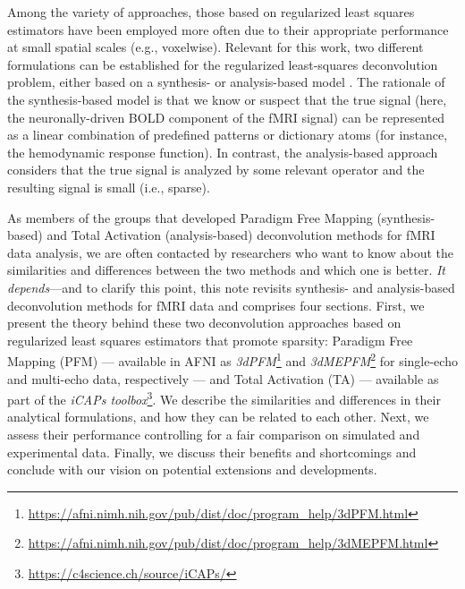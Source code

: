 Among the variety of approaches, those based on regularized least squares
estimators have been employed more often due to their appropriate performance at
small spatial scales (e.g., voxelwise). Relevant for this work, two different
formulations can be established for the regularized least-squares deconvolution
problem, either based on a synthesis- or analysis-based model
\citep{Elad2007Analysisversussynthesis,ortelli2019synthesis}. The rationale
of the synthesis-based model is that we know or suspect that the true signal
(here, the neuronally-driven BOLD component of the fMRI signal) can be
represented as a linear combination of predefined patterns or dictionary atoms
(for instance, the hemodynamic response function). In contrast, the
analysis-based approach considers that the true signal is analyzed by some
relevant operator and the resulting signal is small (i.e., sparse).

As members of the groups that developed Paradigm Free Mapping (synthesis-based)
and Total Activation (analysis-based) deconvolution methods for fMRI data
analysis, we are often contacted by researchers who want to know about the
similarities and differences between the two methods and which one is better.
\emph{It depends}---and to clarify this point, this note revisits synthesis- and
analysis-based deconvolution methods for fMRI data and comprises four sections.
First, we present the theory behind these two deconvolution approaches based on
regularized least squares estimators that promote sparsity: Paradigm Free
Mapping (PFM) \citep{Gaudes2013Paradigmfreemapping} --- available in AFNI as
\textit{3dPFM}\footnote{\url{https://afni.nimh.nih.gov/pub/dist/doc/program_help/3dPFM.html}}
and
\textit{3dMEPFM}\footnote{\url{https://afni.nimh.nih.gov/pub/dist/doc/program_help/3dMEPFM.html}}
for single-echo and multi-echo data, respectively --- and Total Activation (TA)
\citep{Karahanoglu2013TotalactivationfMRI} --- available as part of the
\textit{iCAPs toolbox}\footnote{\url{https://c4science.ch/source/iCAPs/}}. We
describe the similarities and differences in their analytical formulations, and
how they can be related to each other. Next, we assess their performance
controlling for a fair comparison on simulated and experimental data. Finally,
we discuss their benefits and shortcomings and conclude with our vision on
potential extensions and developments.